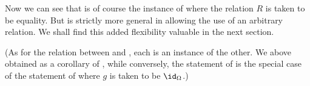 Now we can see that  is of course the instance of  where the relation $R$ is taken to be equality. But  is strictly more general in allowing the use of an arbitrary relation. We shall find this added flexibility valuable in the next section.

(As for the relation between  and , each is an instance of the other. We above obtained  as a corollary of , while conversely, the statement of  is the special case of the statement of  where $g$ is taken to be $\id_{\Omega}$.)

